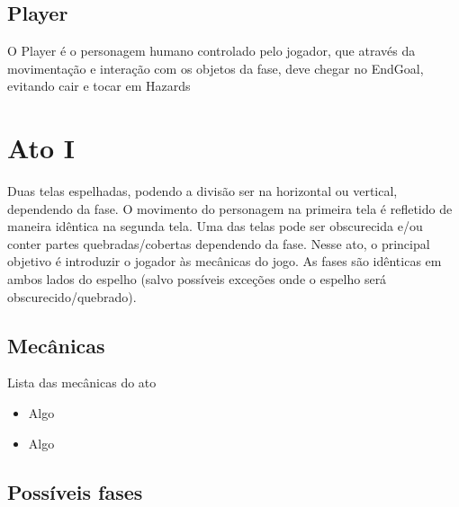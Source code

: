 \documentclass[a4paper, 11pt]{article}
\begin{document}
		\subsection{Player}
			O Player é o personagem humano controlado pelo jogador, que através da movimentação e interação com os objetos da fase, deve chegar no EndGoal, evitando cair e  tocar em Hazards

 
 
\section{Ato I} 
 
	Duas telas espelhadas, podendo a divisão ser na horizontal ou vertical, dependendo da fase. O movimento do 
	personagem na primeira tela é refletido de maneira idêntica na segunda tela. Uma das telas pode ser obscurecida 
	e/ou conter partes quebradas/cobertas dependendo da fase. 
	Nesse ato, o principal objetivo é introduzir o jogador às mecânicas do jogo. As fases são idênticas 
	em ambos lados do espelho (salvo possíveis exceções onde o espelho será obscurecido/quebrado). 
 
\subsection{Mecânicas} 
 
	Lista das mecânicas do ato 
	\begin{itemize} 
		\item Algo 
		\item Algo 
	\end{itemize} 
 
\subsection{Possíveis fases} 
 
\end{document}
